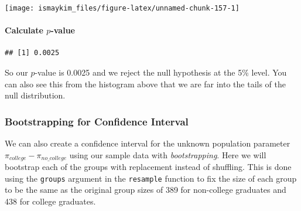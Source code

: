 \documentclass[]{tufte-book}
\newenvironment{Shaded}{\begin{snugshade}}{\end{snugshade}}
\newcommand{\KeywordTok}[1]{\textcolor[rgb]{0.13,0.29,0.53}{\textbf{{#1}}}}
\newcommand{\DataTypeTok}[1]{\textcolor[rgb]{0.13,0.29,0.53}{{#1}}}
\newcommand{\DecValTok}[1]{\textcolor[rgb]{0.00,0.00,0.81}{{#1}}}
\newcommand{\StringTok}[1]{\textcolor[rgb]{0.31,0.60,0.02}{{#1}}}
\newcommand{\OtherTok}[1]{\textcolor[rgb]{0.56,0.35,0.01}{{#1}}}
\newcommand{\NormalTok}[1]{{#1}}
\begin{document}
\begin{center}\texttt{[image: ismaykim\_files/figure-latex/unnamed-chunk-157-1]} \end{center}

\paragraph{\texorpdfstring{Calculate
\(p\)-value}{Calculate p-value}}\label{calculate-p-value-2}

\begin{Shaded}
\end{Shaded}

\begin{verbatim}
## [1] 0.0025
\end{verbatim}

So our \(p\)-value is 0.0025 and we reject the null hypothesis at the
5\% level. You can also see this from the histogram above that we are
far into the tails of the null distribution.

\subsubsection{Bootstrapping for Confidence
Interval}\label{bootstrapping-for-confidence-interval-2}

We can also create a confidence interval for the unknown population
parameter \(\pi_{college} - \pi_{no\_college}\) using our sample data
with \emph{bootstrapping}. Here we will bootstrap each of the groups
with replacement instead of shuffling. This is done using the
\texttt{groups} argument in the \texttt{resample} function to fix the
size of each group to be the same as the original group sizes of 389 for
non-college graduates and 438 for college graduates.

\begin{Shaded}
\end{Shaded}
\end{document}
